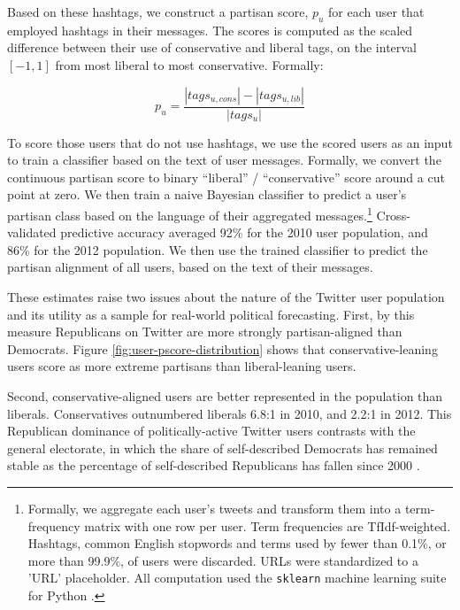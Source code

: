 \documentclass{article}
\begin{document}
Based on these hashtags, we construct a partisan score, $p_u$ for each
user that employed hashtags in their messages. The scores is computed
as the scaled difference between their use of conservative and liberal
tags, on the interval $[-1, 1]$ from most liberal to most
conservative. Formally:

 \begin{equation}
   \label{eq:pscore}
   p_u = \frac{\left|tags_{u,cons}\right| - \left|tags_{u, lib}\right|}{\left|tags_u\right|}
 \end{equation}

To score those users that do not use hashtags, we use the scored users
as an input to train a classifier based on the text of user
messages. Formally, we convert the continuous partisan score to binary
``liberal'' / ``conservative'' score around a cut point at zero. We
then train a naive Bayesian classifier to predict a user's
partisan class based on the language of their aggregated
messages.\footnote{Formally, we aggregate each user's tweets and
transform them into a term-frequency matrix with one row per
user. Term frequencies are TfIdf-weighted. Hashtags,
common English stopwords and terms used by fewer than 0.1\%, or more
than 99.9\%, of users were discarded. URLs were standardized to a
'URL' placeholder. All computation used the \texttt{sklearn} machine
learning suite for Python \cite{scikit-learn}.} Cross-validated
predictive accuracy averaged 92\% for the 2010 user population, and
86\% for the 2012 population. We then use the trained classifier to
predict the partisan alignment of all users, based on the text of
their messages.

These estimates raise two issues about the nature of the Twitter
user population and its utility as a sample for real-world political
forecasting. First, by this measure Republicans on Twitter are more
strongly partisan-aligned than Democrats. Figure
\ref{fig:user-pscore-distribution} shows that conservative-leaning
users score as more extreme partisans than liberal-leaning users.

Second, conservative-aligned users are better represented in the
population than liberals. Conservatives outnumbered liberals 6.8:1 in
2010, and 2.2:1 in 2012. This Republican dominance of
politically-active Twitter users contrasts with the general electorate,
in which the share of self-described Democrats has remained stable as
the percentage of self-described Republicans has fallen since 2000
\cite{pew2012}.
\end{document}
